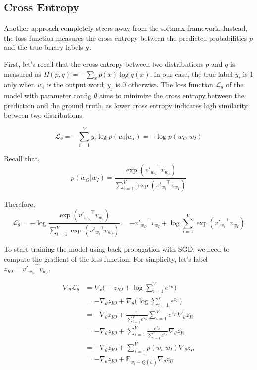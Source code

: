 \subsection{Cross Entropy}
Another approach completely steers away from the softmax framework. Instead, the loss function measures the cross entropy between the predicted probabilities $p$ and the true binary labels $\mathbf{y}$.

First, let's recall that the cross entropy between two distributions $p$ and $q$ is measured as $ H(p, q) = -\sum_x p(x) \log q(x) $. In our case, the true label $y_i$ is 1 only when $w_i$ is the output word; $y_j$ is 0 otherwise. The loss function $\mathcal{L}_\theta$ of the model with parameter config $\theta$ aims to minimize the cross entropy between the prediction and the ground truth, as lower cross entropy indicates high similarity between two distributions.

\[
\mathcal{L}_\theta = - \sum_{i=1}^V y_i \log p(w_i | w_I) = - \log p(w_O \vert w_I)
\]

Recall that,
\[
p(w_O \vert w_I) = \frac{\exp({v'_{w_O}}^{\top} v_{w_I})}{\sum_{i=1}^V \exp({v'_{w_i}}^{\top} v_{w_I})}
\]

Therefore,
\[
\mathcal{L}_{\theta} 
= - \log \frac{\exp({v'_{w_O}}^{\top}{v_{w_I}})}{\sum_{i=1}^V \exp({v'_{w_i}}^{\top}{v_{w_I} })}
= - {v'_{w_O}}^{\top}{v_{w_I} } + \log \sum_{i=1}^V \exp({v'_{w_i} }^{\top}{v_{w_I}})
\]

To start training the model using back-propagation with SGD, we need to compute the gradient of the loss function. For simplicity, let's label $z_{IO} = {v'_{w_O}}^{\top}{v_{w_I}}$.


\begin{align*}
\nabla_\theta \mathcal{L}_{\theta}
&= \nabla_\theta\big( - z_{IO} + \log \sum_{i=1}^V e^{z_{Ii}} \big) \\ 
&= - \nabla_\theta z_{IO} + \nabla_\theta \big( \log \sum_{i=1}^V e^{z_{Ii}} \big) \\
&= - \nabla_\theta z_{IO} + \frac{1}{\sum_{i=1}^V e^{z_{Ii}}} \sum_{i=1}^V e^{z_{Ii}} \nabla_\theta z_{Ii} \\
&= - \nabla_\theta z_{IO} + \sum_{i=1}^V \frac{e^{z_{Ii}}}{\sum_{i=1}^V e^{z_{Ii}}} \nabla_\theta z_{Ii} \\
&= - \nabla_\theta z_{IO} + \sum_{i=1}^V p(w_i \vert w_I) \nabla_\theta z_{Ii} \\
&= - \nabla_\theta z_{IO} + \mathbb{E}_{w_i \sim Q(\tilde{w})} \nabla_\theta z_{Ii}
\end{align*}

